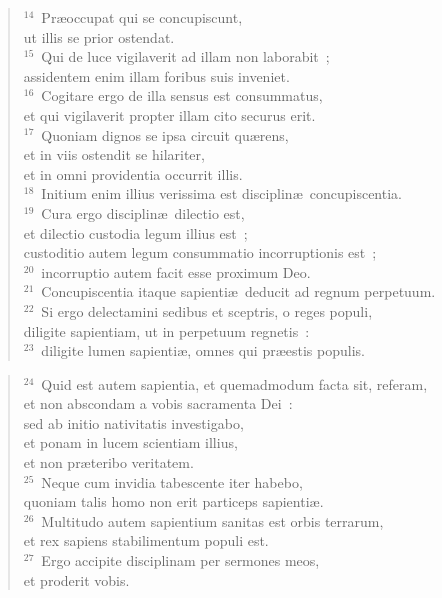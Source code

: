\begin{flushleft}
\begin{verse}
${}^{14}$~Pr\ae occupat qui se concupiscunt,\\ ut illis se prior ostendat.\\
${}^{15}$~Qui de luce vigilaverit ad illam non laborabit~;\\ assidentem enim illam foribus suis inveniet.\\
${}^{16}$~Cogitare ergo de illa sensus est consummatus,\\ et qui vigilaverit propter illam cito securus erit.\\
${}^{17}$~Quoniam dignos se ipsa circuit qu\ae rens,\\ et in viis ostendit se hilariter,\\ et in omni providentia occurrit illis.\\
${}^{18}$~Initium enim illius verissima est disciplin\ae\ concupiscentia.\\
${}^{19}$~Cura ergo disciplin\ae\ dilectio est,\\ et dilectio custodia legum illius est~;\\ custoditio autem legum consummatio incorruptionis est~;\\
${}^{20}$~incorruptio autem facit esse proximum Deo.\\
${}^{21}$~Concupiscentia itaque sapienti\ae\ deducit ad regnum perpetuum.\\
${}^{22}$~Si ergo delectamini sedibus et sceptris, o reges populi,\\ diligite sapientiam, ut in perpetuum regnetis~:\\
${}^{23}$~diligite lumen sapienti\ae , omnes qui pr\ae estis populis.\end{verse}\end{flushleft}


\begin{flushleft}\begin{verse}${}^{24}$~Quid est autem sapientia, et quemadmodum facta sit, referam,\\ et non abscondam a vobis sacramenta Dei~:\\ sed ab initio nativitatis investigabo,\\ et ponam in lucem scientiam illius,\\ et non pr\ae teribo veritatem.\\
${}^{25}$~Neque cum invidia tabescente iter habebo,\\ quoniam talis homo non erit particeps sapienti\ae .\\
${}^{26}$~Multitudo autem sapientium sanitas est orbis terrarum,\\ et rex sapiens stabilimentum populi est.\\
${}^{27}$~Ergo accipite disciplinam per sermones meos,\\ et proderit vobis.\end{verse}\end{flushleft}


